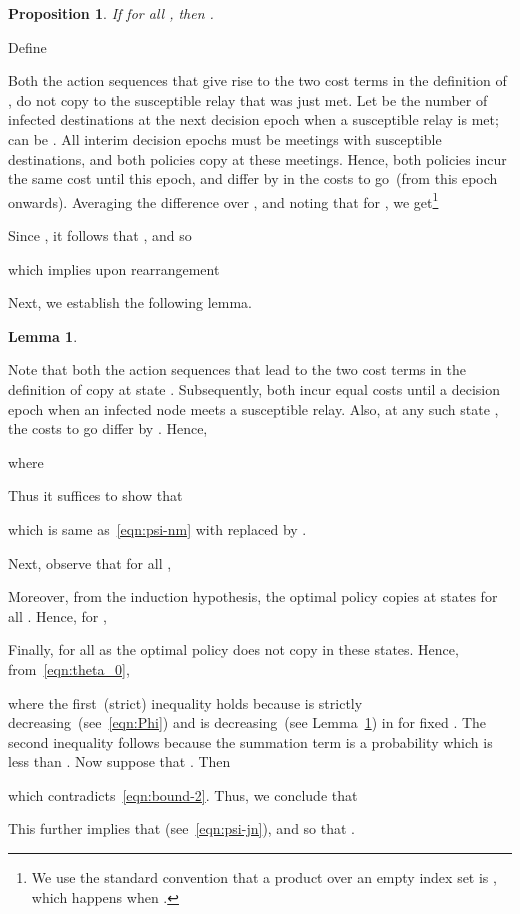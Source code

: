 \documentclass[10pt,journal,letterpaper]{IEEEtran}
\newtheorem{lemma}{Lemma}[section]
\newtheorem{proposition}{Proposition}[section]
\begin{document}
\begin{proposition}
If  for all , then .
\end{proposition}
\begin{IEEEproof}
Define

Both the action sequences that give rise to the two cost terms in
the definition of , do not copy to the
susceptible relay that was just met. Let  be the number of infected
destinations at the next decision epoch when a susceptible relay is
met;  can be . All interim decision epochs must be
meetings with susceptible destinations, and both policies copy at
these meetings. Hence, both policies incur the same cost until this
epoch, and differ by  in the costs to go~(from this epoch onwards).
Averaging the difference over , and noting that  for , we get\footnote{We use the
standard convention that a product over an empty index set is ,
which happens when .}

Since , it follows that , and so
\vspace{1pt}

which implies upon rearrangement


Next, we establish the following lemma.
\begin{lemma}
\label{lma:lemma2}

\end{lemma}
\begin{IEEEproof}
Note that both the action sequences that lead to the two cost terms in
the definition of  copy at state .
Subsequently, both incur equal costs until a decision epoch when
an infected node meets a susceptible relay. Also, at any such state
, the costs to go differ by .
Hence,

where

Thus it suffices to show that

which is same as~\eqref{eqn:psi-nm} with  replaced by .
\end{IEEEproof}

Next, observe that for all ,

Moreover, from the induction hypothesis, the optimal policy copies at states
 for all . Hence, for ,

Finally,  for all  as the optimal policy does not copy
in these states.
Hence, from~\eqref{eqn:theta_0},

where the first~(strict) inequality holds because  is strictly decreasing~(see~\eqref{eqn:Phi})
and  is decreasing~(see Lemma~\ref{lma:lemma2}) in  for fixed
. The second inequality follows because the summation term is a probability which is less than .
Now suppose that .
Then

which contradicts~\eqref{eqn:bound-2}. Thus, we conclude that

This further implies that  (see~\eqref{eqn:psi-jn}),
and so that .
\end{IEEEproof}
\end{document}

